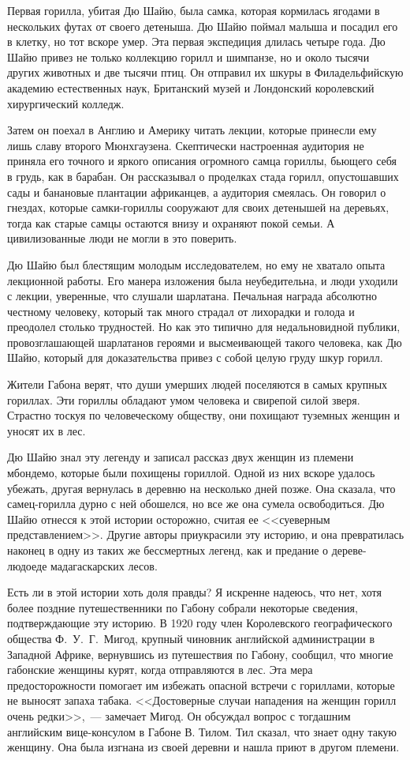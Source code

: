 \documentclass[12pt,a4paper,twoside,openany,svgnames]{memoir}
\begin{document}
Первая горилла, убитая Дю Шайю, была самка, которая кормилась ягодами в нескольких футах от своего детеныша. Дю Шайю поймал малыша и посадил его в клетку, но тот вскоре умер. Эта первая экспедиция длилась четыре года. Дю Шайю привез не только коллекцию горилл и шимпанзе, но и около тысячи других животных и две тысячи птиц. Он отправил их шкуры в Филадельфийскую академию естественных наук, Британский музей и Лондонский королевский хирургический колледж.

Затем он поехал в Англию и Америку читать лекции, которые принесли ему лишь славу второго Мюнхгаузена. Скептически настроенная аудитория не приняла его точного и яркого описания огромного самца гориллы, бьющего себя в грудь, как в барабан. Он рассказывал о проделках стада горилл, опустошавших сады и банановые плантации африканцев, а аудитория смеялась. Он говорил о гнездах, которые самки-гориллы сооружают для своих детенышей на деревьях, тогда как старые самцы остаются внизу и охраняют покой семьи. А цивилизованные люди не могли в это поверить.

Дю Шайю был блестящим молодым исследователем, но ему не хватало опыта лекционной работы. Его манера изложения была неубедительна, и люди уходили с лекции, уверенные, что слушали шарлатана. Печальная награда абсолютно честному человеку, который так много страдал от лихорадки и голода и преодолел столько трудностей. Но как это типично для недальновидной публики, провозглашающей шарлатанов героями и высмеивающей такого человека, как Дю Шайю, который для доказательства привез с собой целую груду шкур горилл.

Жители Габона верят, что души умерших людей поселяются в самых крупных гориллах. Эти гориллы обладают умом человека и свирепой силой зверя. Страстно тоскуя по человеческому обществу, они похищают туземных женщин и уносят их в лес.

Дю Шайю знал эту легенду и записал рассказ двух женщин из племени мбондемо, которые были похищены гориллой. Одной из них вскоре удалось убежать, другая вернулась в деревню на несколько дней позже. Она сказала, что самец-горилла дурно с ней обошелся, но все же она сумела освободиться. Дю Шайю отнесся к этой истории осторожно, считая ее <<суеверным представлением>>. Другие авторы приукрасили эту историю, и она превратилась наконец в одну из таких же бессмертных легенд, как и предание о дереве-людоеде мадагаскарских лесов.

Есть ли в этой истории хоть доля правды? Я искренне надеюсь, что нет, хотя более поздние путешественники по Габону собрали некоторые сведения, подтверждающие эту историю. В 1920 году член Королевского географического общества Ф.~У.~Г.~Мигод, крупный чиновник английской администрации в Западной Африке, вернувшись из путешествия по Габону, сообщил, что многие габонские женщины курят, когда отправляются в лес. Эта мера предосторожности помогает им избежать опасной встречи с гориллами, которые не выносят запаха табака. <<Достоверные случаи нападения на женщин горилл очень редки>>,~--- замечает Мигод. Он обсуждал вопрос с тогдашним английским вице-консулом в Габоне В. Тилом. Тил сказал, что знает одну такую женщину. Она была изгнана из своей деревни и нашла приют в другом племени.
\end{document}
